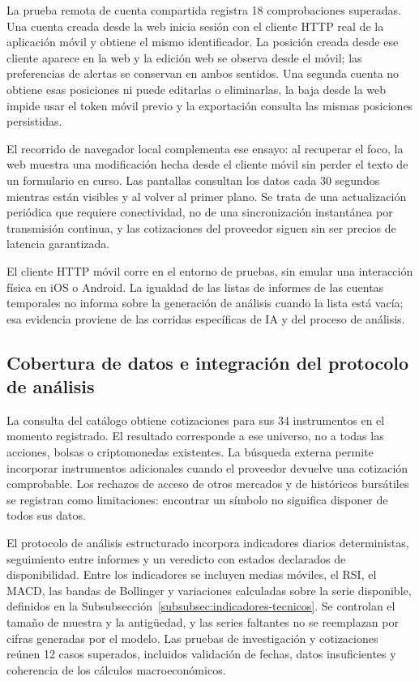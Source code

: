 La prueba remota de cuenta compartida registra 18 comprobaciones superadas. Una cuenta creada desde la web inicia sesión con el cliente HTTP real de la aplicación móvil y obtiene el mismo identificador. La posición creada desde ese cliente aparece en la web y la edición web se observa desde el móvil; las preferencias de alertas se conservan en ambos sentidos. Una segunda cuenta no obtiene esas posiciones ni puede editarlas o eliminarlas, la baja desde la web impide usar el token móvil previo y la exportación consulta las mismas posiciones persistidas.

El recorrido de navegador local complementa ese ensayo: al recuperar el foco, la web muestra una modificación hecha desde el cliente móvil sin perder el texto de un formulario en curso. Las pantallas consultan los datos cada 30 segundos mientras están visibles y al volver al primer plano. Se trata de una actualización periódica que requiere conectividad, no de una sincronización instantánea por transmisión continua, y las cotizaciones del proveedor siguen sin ser precios de latencia garantizada.

El cliente HTTP móvil corre en el entorno de pruebas, sin emular una interacción física en iOS o Android. La igualdad de las listas de informes de las cuentas temporales no informa sobre la generación de análisis cuando la lista está vacía; esa evidencia proviene de las corridas específicas de IA y del proceso de análisis.

\subsection{Cobertura de datos e integración del protocolo de análisis}

La consulta del catálogo obtiene cotizaciones para sus 34 instrumentos en el momento registrado. El resultado corresponde a ese universo, no a todas las acciones, bolsas o criptomonedas existentes. La búsqueda externa permite incorporar instrumentos adicionales cuando el proveedor devuelve una cotización comprobable. Los rechazos de acceso de otros mercados y de históricos bursátiles se registran como limitaciones: encontrar un símbolo no significa disponer de todos sus datos.

El protocolo de análisis estructurado incorpora indicadores diarios deterministas, seguimiento entre informes y un veredicto con estados declarados de disponibilidad. Entre los indicadores se incluyen medias móviles, el RSI, el MACD, las bandas de Bollinger y variaciones calculadas sobre la serie disponible, definidos en la Subsubsección~\ref{subsubsec:indicadores-tecnicos}. Se controlan el tamaño de muestra y la antigüedad, y las series faltantes no se reemplazan por cifras generadas por el modelo. Las pruebas de investigación y cotizaciones reúnen 12 casos superados, incluidos validación de fechas, datos insuficientes y coherencia de los cálculos macroeconómicos.

